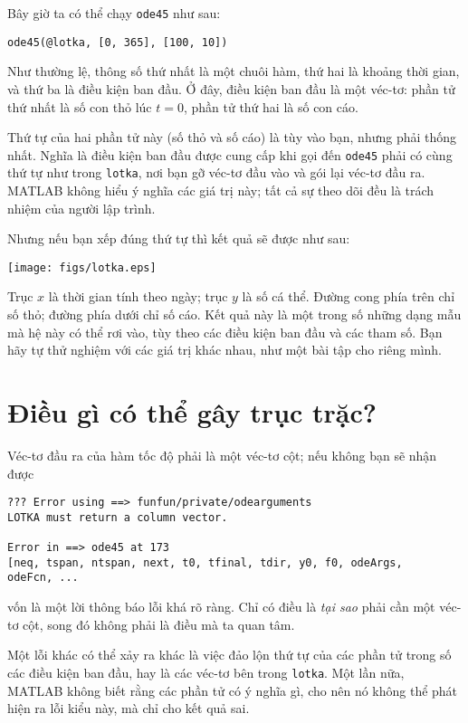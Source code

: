 \documentclass[12pt]{book}
\begin{document}
Bây giờ ta có thể chạy {\tt ode45} như sau:

\begin{verbatim}
ode45(@lotka, [0, 365], [100, 10])
\end{verbatim}
%
Như thường lệ, thông số thứ nhất là một chuôi hàm, thứ hai là 
khoảng thời gian, và thứ ba là điều kiện ban đầu. Ở đây, điều kiện
ban đầu là một véc-tơ: phần tử thứ nhất là số con thỏ lúc 
$t=0$, phần tử thứ hai là số con cáo.

Thứ tự của hai phần tử này (số thỏ và số cáo) là tùy vào bạn, nhưng
phải thống nhất. Nghĩa là điều kiện ban đầu được cung cấp khi gọi
đến {\tt ode45} phải có cùng thứ tự như trong {\tt lotka}, 
nơi bạn gỡ véc-tơ đầu vào và gói lại véc-tơ đầu ra. 
MATLAB không hiểu ý nghĩa các giá trị này; tất cả sự theo dõi đều là
trách nhiệm của người lập trình.

Nhưng nếu bạn xếp đúng thứ tự thì kết quả sẽ được như sau:

\centerline{\texttt{[image: figs/lotka.eps]}}

Trục $x$ là thời gian tính theo ngày; trục $y$ là số cá thể. 
Đường cong phía trên chỉ số thỏ; đường phía dưới chỉ số cáo.
Kết quả này là một trong số những dạng mẫu mà hệ này
có thể rơi vào, tùy theo các điều kiện ban đầu và các tham số.
Bạn hãy tự thử nghiệm với các giá trị khác nhau, như một
bài tập cho riêng mình.


\section{Điều gì có thể gây trục trặc?}

Véc-tơ đầu ra của hàm tốc độ phải là một véc-tơ cột; 
nếu không bạn sẽ nhận được

\begin{verbatim}
??? Error using ==> funfun/private/odearguments
LOTKA must return a column vector.

Error in ==> ode45 at 173
[neq, tspan, ntspan, next, t0, tfinal, tdir, y0, f0, odeArgs,
odeFcn, ...
\end{verbatim}
%
vốn là một lời thông báo lỗi khá rõ ràng. Chỉ có điều là {\em tại sao}
phải cần một véc-tơ cột, song đó không phải là điều mà ta quan tâm.

Một lỗi khác có thể xảy ra khác là việc đảo lộn thứ tự của các phần tử
trong số các điều kiện ban đầu, hay là các véc-tơ bên trong {\tt lotka}. 
Một lần nữa, MATLAB không biết rằng các phần tử có ý nghĩa gì, cho
nên nó không thể phát hiện ra lỗi kiểu này, mà chỉ cho kết quả sai.
\end{document}
